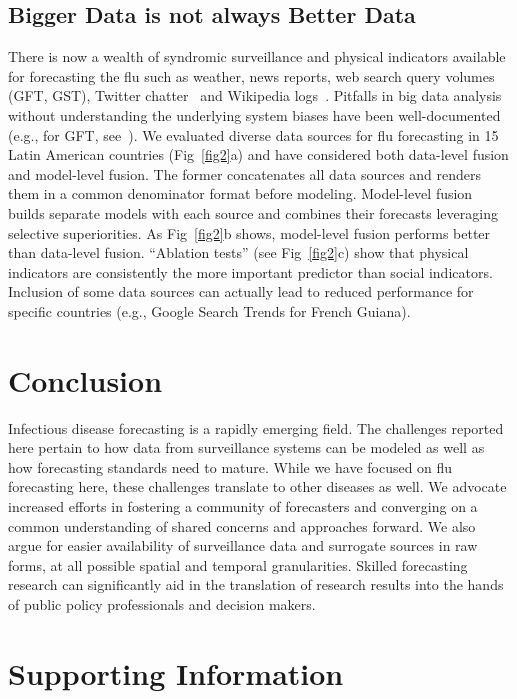 \documentclass[10pt,letterpaper]{article}
\begin{document}
\subsection*{Bigger Data is not always Better Data}
There is now a wealth of syndromic surveillance and physical indicators
available for forecasting the flu such as weather, news reports, web search
query volumes (GFT, GST), Twitter chatter~\cite{chakraborty2014forecasting} and
Wikipedia logs~\cite{mciver2014wikipedia,hickman2015wikipedia}.  Pitfalls in
big data analysis without understanding the underlying system biases have been
well-documented (e.g., for GFT, see~\cite{lazer2014parable}).  We evaluated
diverse data sources for flu forecasting in 15 Latin American countries
(Fig~\ref{fig2}a) and have considered both data-level fusion and model-level
fusion. The former concatenates all data sources and renders them in a common
denominator format before modeling. Model-level fusion builds separate models
with each source and combines their forecasts leveraging selective
superiorities. As Fig~\ref{fig2}b shows, model-level fusion performs better
than data-level fusion. “Ablation tests” (see Fig~\ref{fig2}c) show that
physical indicators are consistently the more important predictor than social
indicators. Inclusion of some data sources can actually lead to reduced
performance for specific countries (e.g., Google Search Trends for French
Guiana).

\section*{Conclusion}
Infectious disease forecasting is a rapidly emerging field. The challenges
reported here pertain to how data from surveillance systems can be modeled as
well as how forecasting standards need to mature. While we have focused on flu
forecasting here, these challenges translate to other diseases as well. We
advocate increased efforts in fostering a community of forecasters and
converging on a common understanding of shared concerns and approaches forward.
We also argue for easier availability of surveillance data and surrogate
sources in raw forms, at all possible spatial and temporal granularities.
Skilled forecasting research can significantly aid in the translation of
research results into the hands of public policy professionals and decision
makers.

\section*{Supporting Information}
\end{document}
